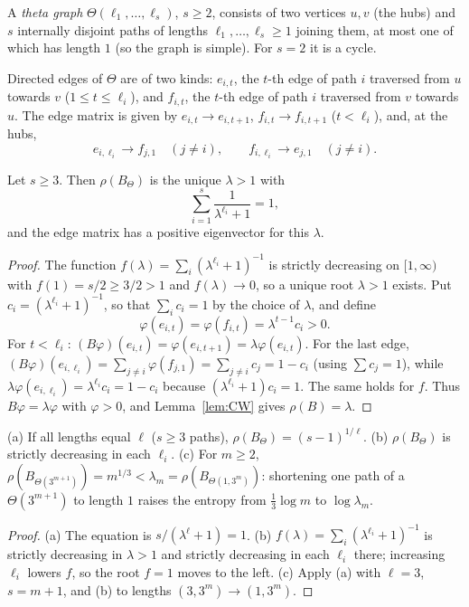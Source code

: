 A \emph{theta graph} $\Theta(\ell_1,\dots,\ell_s)$, $s\ge2$, consists of two vertices $u,v$ (the hubs) and $s$ internally disjoint paths of lengths $\ell_1,\dots,\ell_s\ge1$ joining them, at most one of which has length $1$ (so the graph is simple). For $s=2$ it is a cycle.

Directed edges of $\Theta$ are of two kinds: $e_{i,t}$, the $t$-th edge of path $i$ traversed from $u$ towards $v$ ($1\le t\le\ell_i$), and $f_{i,t}$, the $t$-th edge of path $i$ traversed from $v$ towards $u$. The edge matrix is given by $e_{i,t}\to e_{i,t+1}$, $f_{i,t}\to f_{i,t+1}$ ($t<\ell_i$), and, at the hubs,
\[
e_{i,\ell_i}\to f_{j,1}\quad(j\ne i),\qquad f_{i,\ell_i}\to e_{j,1}\quad(j\ne i).
\]

\begin{theorem}\label{thm:theta}
Let $s\ge3$. Then $\rho(B_\Theta)$ is the unique $\lambda>1$ with
\[
\sum_{i=1}^s\frac1{\lambda^{\ell_i}+1}=1,
\]
and the edge matrix has a positive eigenvector for this $\lambda$.
\end{theorem}
\begin{proof}
The function $f(\lambda)=\sum_i(\lambda^{\ell_i}+1)^{-1}$ is strictly decreasing on $[1,\infty)$ with $f(1)=s/2\ge3/2>1$ and $f(\lambda)\to0$, so a unique root $\lambda>1$ exists. Put $c_i=(\lambda^{\ell_i}+1)^{-1}$, so that $\sum_ic_i=1$ by the choice of $\lambda$, and define
\[
\varphi(e_{i,t})=\varphi(f_{i,t})=\lambda^{t-1}c_i>0 .
\]
For $t<\ell_i$: $(B\varphi)(e_{i,t})=\varphi(e_{i,t+1})=\lambda\varphi(e_{i,t})$. For the last edge, $(B\varphi)(e_{i,\ell_i})=\sum_{j\ne i}\varphi(f_{j,1})=\sum_{j\ne i}c_j=1-c_i$ (using $\sum c_j=1$), while $\lambda\varphi(e_{i,\ell_i})=\lambda^{\ell_i}c_i=1-c_i$ because $(\lambda^{\ell_i}+1)c_i=1$. The same holds for $f$. Thus $B\varphi=\lambda\varphi$ with $\varphi>0$, and Lemma~\ref{lem:CW} gives $\rho(B)=\lambda$. \qedhere
\end{proof}

\begin{corollary}[Comparisons]\label{cor:theta}
(a) If all lengths equal $\ell$ ($s\ge3$ paths), $\rho(B_\Theta)=(s-1)^{1/\ell}$.
(b) $\rho(B_\Theta)$ is strictly decreasing in each $\ell_i$.
(c) For $m\ge2$, $\rho(B_{\Theta(3^{m+1})})=m^{1/3}<\lambda_m=\rho(B_{\Theta(1,3^m)})$: shortening one path of a $\Theta(3^{m+1})$ to length $1$ raises the entropy from $\tfrac13\log m$ to $\log\lambda_m$.
\end{corollary}
\begin{proof}
(a) The equation is $s/(\lambda^\ell+1)=1$. (b) $f(\lambda)=\sum_i(\lambda^{\ell_i}+1)^{-1}$ is strictly decreasing in $\lambda>1$ and strictly decreasing in each $\ell_i$ there; increasing $\ell_i$ lowers $f$, so the root $f=1$ moves to the left. (c) Apply (a) with $\ell=3$, $s=m+1$, and (b) to lengths $(3,3^m)\to(1,3^m)$. \qedhere
\end{proof}

